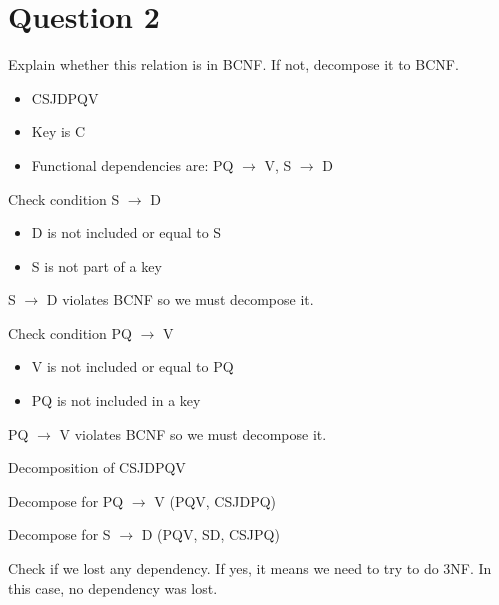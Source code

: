 \documentclass[letterpaper, 11pt]{article}
\begin{document}
\section*{Question 2}

Explain whether this relation is in BCNF. If not, decompose it to BCNF.
\begin{itemize}
    \item CSJDPQV
    \item Key is C
    \item Functional dependencies are: PQ $\to$ V, S $\to$ D
\end{itemize}

\begin{tcolorbox}
Check condition S $\to$ D
\begin{itemize}
    \item D is not included or equal to S
    \item S is not part of a key
\end{itemize}

S $\to$ D violates BCNF so we must decompose it.

Check condition PQ $\to$ V
\begin{itemize}
    \item V is not included or equal to PQ
    \item PQ is not included in a key
\end{itemize}

PQ $\to$ V violates BCNF so we must decompose it.

Decomposition of CSJDPQV

Decompose for PQ $\to$ V (PQV, CSJDPQ)

Decompose for  S $\to$ D (PQV, SD, CSJPQ)

Check if we lost any dependency. If yes, it means we need to try to do 3NF. In this case, no dependency was lost.
\end{tcolorbox}
\end{document}
